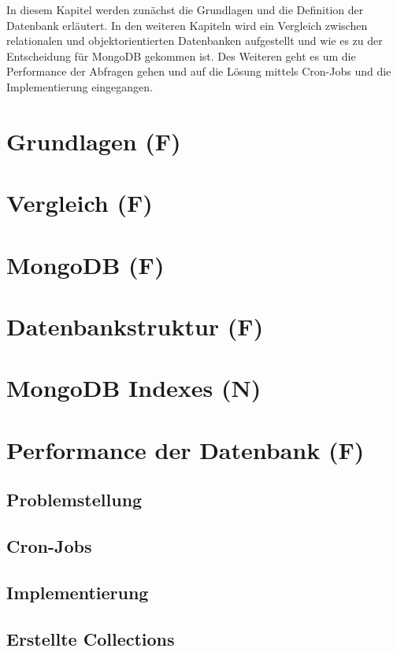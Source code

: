 In diesem Kapitel werden zunächst die Grundlagen und die Definition der Datenbank erläutert. In den weiteren Kapiteln wird ein Vergleich zwischen relationalen und objektorientierten Datenbanken aufgestellt und wie es zu der Entscheidung für MongoDB gekommen ist. Des Weiteren geht es um die Performance der Abfragen gehen und auf die Lösung mittels Cron-Jobs und die Implementierung eingegangen.

\section{Grundlagen (F)}


\section{Vergleich (F)}


\section{MongoDB (F)}


\section{Datenbankstruktur (F)}


\section{MongoDB Indexes (N)}


\section{Performance der Datenbank (F)}


\subsection{Problemstellung}


\subsection{Cron-Jobs}


\subsection{Implementierung}


\subsection{Erstellte Collections}
